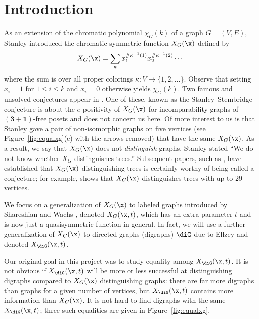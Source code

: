\section{Introduction}
 
As an extension of the chromatic polynomial $\chi_G(k)$ of a graph $G =  (V,E)$, Stanley \cite{Sta95} introduced the chromatic symmetric function $X_G(\x)$ defined by
\begin{equation}\label{equ:stanley}
X_G(\x) = \sum_\kappa x_1^{\# \kappa^{-1}(1)} x_2^{\# \kappa^{-1}(2)} \cdots
\end{equation}
where the sum is over all proper colorings $\kappa : V \to \{1,2,\ldots\}$.  Observe that setting $x_i=1$ for $1\leq i \leq k$ and $x_i=0$ otherwise yields $\chi_G(k)$.  Two famous and unsolved conjectures appear in \cite{Sta95}.  One of these, known as the Stanley--Stembridge conjecture \cite[Conj.~5.5]{StSt93}\cite[Conj.~5.1]{Sta95} is about the $e$-positivity of $X_G(\x)$ for incomparability graphs of $(\mathbf{3}+\mathbf{1})$-free posets and does not concern us here.  Of more interest to us is that Stanley gave a pair of non-isomorphic graphs on five vertices (see Figure~\ref{fig:equalxg}(c) with the arrows removed) that have the same $X_G(\x)$.  As a result, we say that $X_G(\x)$ does not \emph{distinguish} graphs.  Stanley stated ``We do not know whether $X_G$ distinguishes trees.''  Subsequent papers, such as \cite{AMZ17,AMZ21,AlZa14,Fou03,HeJi19,HuCh20,LoSe19,MMW08,OrSc14,SST15}, have established that $X_G(\x)$ distinguishing trees is certainly worthy of being called a conjecture; for example, \cite{HeJi19} shows that $X_G(\x)$ distinguishes trees with up to 29 vertices.

We focus on a generalization of $X_G(\x)$ to labeled graphs introduced by Shareshian and Wachs \cite{ShWa16}, denoted $X_G(\x, t)$, which has an extra parameter $t$ and is now just a quasisymmetric function in general.  In fact, we will use a further generalization of $X_G(\x)$ to directed graphs (digraphs) $\diG$ due to Ellzey \cite{Ell17,Ell17+,EllThesis} and denoted $X_{\diG}(\x,t)$. 

Our original goal in this project was to study equality among $X_{\diG}(\x, t)$.  It is not obvious if $X_{\diG}(\x, t)$ will be more or less successful at distinguishing digraphs compared to $X_G(\x)$ distinguishing graphs: there are far more digraphs than graphs for a given number of vertices, but $X_{\diG}(\x, t)$ contains more information than $X_G(\x)$.  It is not hard to find digraphs with the same $X_{\diG}(\x, t)$; three such equalities are given in Figure~\ref{fig:equalxg}.  

